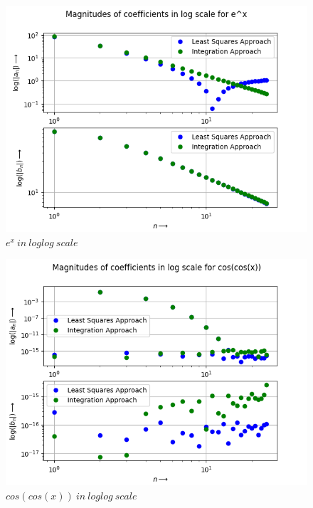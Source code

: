 \documentclass[11pt, a4paper]{article}
\begin{document}
\begin{figure}
    \centering
    \includegraphics[scale = 0.7]{Q5-3.png}
    \caption{$e^x\ in\ loglog\ scale$}
    \label{fig:Figure 9}
\end{figure}
\begin{figure}
    \centering
    \includegraphics[scale = 0.7]{Q5-4.png}
    \caption{$cos(cos(x))\ in\ loglog\ scale$}
    \label{fig:Figure 10}
\end{figure}

\newpage
\end{document}
